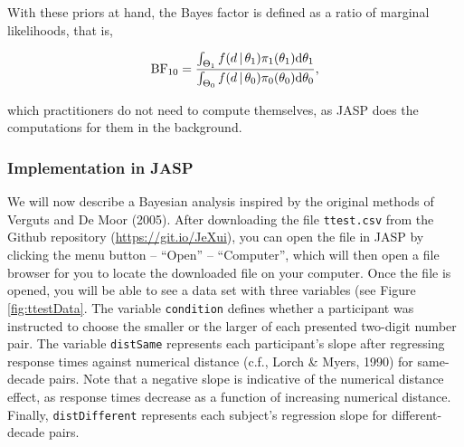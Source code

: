 \documentclass[english,,doc,floatsintext]{apa6}
\begin{document}
With these priors at hand, the Bayes factor is defined as a ratio of marginal likelihoods, that is,

\begin{align}
\textnormal{BF}_{10} = \frac{ \int_{\Theta_{1}} f(d \, | \, \theta_{1}) \pi_{1}(\theta_{1}) \textnormal{d} \theta_{1}}{\int_{\Theta_{0}} f(d \, | \, \theta_{0}) \pi_{0}(\theta_{0}) \textnormal{d} \theta_{0}},
\end{align}

which practitioners do not need to compute themselves, as JASP does the computations for them in the background.

\hypertarget{implementation-in-jasp}{%
\subsubsection{Implementation in JASP}\label{implementation-in-jasp}}

We will now describe a Bayesian analysis inspired by the original methods of Verguts and De Moor (2005). After downloading the file \texttt{ttest.csv} from the Github repository (\url{https://git.io/JeXui}), you can open the file in JASP by clicking the menu button -- \enquote{Open} -- \enquote{Computer}, which will then open a file browser for you to locate the downloaded file on your computer. Once the file is opened, you will be able to see a data set with three variables (see Figure \ref{fig:ttestData}. The variable \texttt{condition} defines whether a participant was instructed to choose the smaller or the larger of each presented two-digit number pair. The variable \texttt{distSame} represents each participant's slope after regressing response times against numerical distance (c.f., Lorch \& Myers, 1990) for same-decade pairs. Note that a negative slope is indicative of the numerical distance effect, as response times decrease as a function of increasing numerical distance. Finally, \texttt{distDifferent} represents each subject's regression slope for different-decade pairs.
\end{document}

